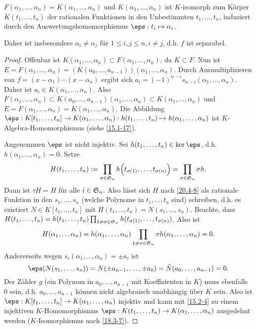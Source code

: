 \begin{lem} \label{20.4-9}
	$F(\alpha_1, \dotsc, \alpha_n) = K(\alpha_1, \dotsc, \alpha_n)$ und $K(\alpha_1, \dotsc, \alpha_n)$ ist $K$-isomorph zum Körper $K(t_1, \dotsc, t_n)$ der rationalen Funktionen in den Unbestimmten $t_1, \dotsc, t_n$, induziert durch den Auswertungshomomorphismus $\eps: t_i \mapsto \alpha_i$.
	\begin{note}
		Daher ist insbesondere $\alpha_i \neq \alpha_j$ für $1 \le i, j \le n, i \neq j$, d.h. $f$ ist separabel.
	\end{note}
	\begin{proof}
		Offenbar ist $K(\alpha_1, \dotsc, \alpha_n) \subset F(\alpha_1, \dotsc, \alpha_n)$, da $K \subset F$.
		Nun ist $E = F(\alpha_1, \dotsc, \alpha_n) = (K(a_0, \dotsc, a_{n-1}))(\alpha_1, \dotsc, \alpha_n)$.
		Durch Ausmultiplizieren von $f = (x-\alpha_1) \dotsb (x-\alpha_n)$ ergibt sich $a_i = (-1)^{n-i} s_{n-i}(\alpha_1, \dotsc, \alpha_n)$.
		Daher ist $a_i \in K(\alpha_1, \dotsc, \alpha_n)$.
		Also $F(\alpha_1, \dotsc, \alpha_n) \subset K(a_0, \dotsc, a_{n-1})(\alpha_1, \dotsc, \alpha_n) \subset K(\alpha_1, \dotsc, \alpha_n)$ und $E = F(\alpha_1, \dotsc, \alpha_n) = K(\alpha_1, \dotsc, \alpha_n)$.
		Die Abbildung $\eps: K[t_1, \dotsc, t_n] \to K(\alpha_1, \dotsc, \alpha_n): h(t_1, \dotsc, t_n) \mapsto h(\alpha_1, \dotsc, \alpha_n)$ ist $K$-Algebra-Homomorphismus (siehe \ref{15.1-17}).

		Angenommen $\eps$ ist nicht injektiv.
		Sei $h(t_1, \dotsc, t_n) \in \ker \eps$, d.h. $h(\alpha_1, \dotsc, \alpha_n) = 0$.
		Setze
		\[
			H(t_1, \dotsc, t_n)
			:= \prod_{\sigma \in \S_n} h\Big(t_{\sigma(1)}, \dotsc, t_{\sigma(n)} \Big)
			= \prod_{\sigma \in \S_n} \sigma h .
		\]
		Dann ist $\tau H = H$ für alle $i \in \S_n$.
		Also lässt sich $H$ nach \ref{20.4-8} als rationale Funktion in den $s_1, \dotsc, s_n$ (welche Polynome in $t_1, \dotsc, t_n$ sind) schreiben, d.h. es existiert $N \in K[t_1, \dotsc, t_n]$ mit $H(t_1, \dotsc, t_n) = N(s_1, \dotsc, s_n)$.
		Beachte, dass $H(t_1, \dotsc, t_n) = h(t_1, \dotsc, t_n) \prod_{1 \neq \sigma \in \S_n} h(t_{\sigma(1)}, \dotsc, t_{\sigma(n)})$.
		Also ist
		\[
			H(\alpha_1, \dotsc \alpha_n)
			= h(\alpha_1, \dotsc, \alpha_n) \prod_{1 \neq \sigma \in \S_n} \sigma h(\alpha_1, \dotsc, \alpha_n)
			= 0.
		\]
		Andererseits wegen $s_i(\alpha_1, \dotsc, \alpha_n) = \pm a_i$ ist
		\[
			\eps(N(s_1, \dotsc, s_n)) = N(\pm a_{n-1}, \dotsc, \pm a_0) = \tilde N(a_0, \dotsc, a_{n-1}) = 0.
		\]
		Der Zähler $g$ (ein Polynom in $a_0, \dotsc, a_{n-1}$ mit Koeffizienten in $K$) muss ebenfalls $0$ sein, d.h. $a_0, \dotsc, a_{n-1}$ können nicht algebraisch unabhängig über $K$ sein.
		Also ist $\eps: K[t_1, \dotsc, t_n] \to K(\alpha_1, \dotsc, \alpha_n)$ injektiv und kann mit \ref{15.2-4} zu einem injektiven $K$-Homomorphismus $\eps: K(t_1, \dotsc, t_n) \to K(\alpha_1, \dotsc, \alpha_n)$ ausgedehnt werden ($K$-Isomorphismus nach \ref{18.3-7}).
	\end{proof}
\end{lem}

